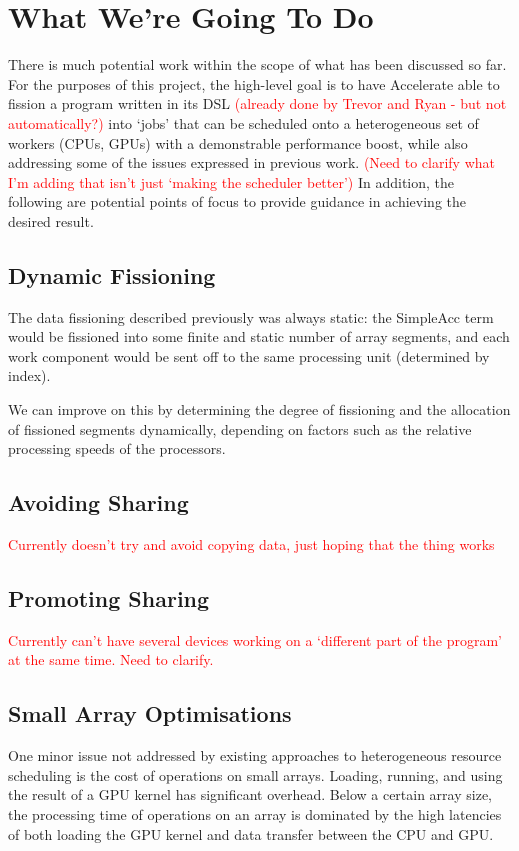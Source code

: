 \documentclass[a4paper,12pt]{article}
\newcommand{\red}[1]{\textcolor{red}{#1}}
\begin{document}
\section{What We're Going To Do}
There is much potential work within the scope of what has been discussed so far.
For the purposes of this project, the high-level goal is to have Accelerate able to fission a program written in its DSL \red{(already done by Trevor and Ryan - but not automatically?)} into `jobs' that can be scheduled onto a heterogeneous set of workers (CPUs, GPUs) with a demonstrable performance boost, while also addressing some of the issues expressed in previous work.
\red{(Need to clarify what I'm adding that isn't just `making the scheduler better')}
In addition, the following are potential points of focus to provide guidance in achieving the desired result.

\subsection{Dynamic Fissioning}
The data fissioning described previously was always static: the SimpleAcc term would be fissioned into some finite and static number of array segments, and each work component would be sent off to the same processing unit (determined by index).

We can improve on this by determining the degree of fissioning and the allocation of fissioned segments dynamically, depending on factors such as the relative processing speeds of the processors.

\subsection{Avoiding Sharing}
\red{Currently doesn't try and avoid copying data, just hoping that the thing works}

\subsection{Promoting Sharing}
\red{Currently can't have several devices working on a `different part of the program' at the same time. Need to clarify.}

\subsection{Small Array Optimisations}
One minor issue not addressed by existing approaches to heterogeneous resource scheduling is the cost of operations on small arrays.
Loading, running, and using the result of a GPU kernel has significant overhead.
Below a certain array size, the processing time of operations on an array is dominated by the high latencies of both loading the GPU kernel and data transfer between the CPU and GPU.
\end{document}
